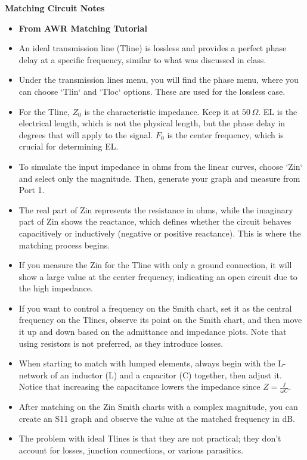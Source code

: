 \documentclass{article}
\begin{document}
\textbf{Matching Circuit Notes}
\begin{itemize}
    \item \textbf{From AWR Matching Tutorial}
    \item An ideal transmission line (Tline) is lossless and provides a perfect phase delay at a specific frequency, similar to what was discussed in class.
    \item Under the transmission lines menu, you will find the phase menu, where you can choose `Tlin` and `Tloc` options. These are used for the lossless case.
    \item For the Tline, \(Z_0\) is the characteristic impedance. Keep it at $50\,\Omega$. EL is the electrical length, which is not the physical length, but the phase delay in degrees that will apply to the signal. \(F_0\) is the center frequency, which is crucial for determining EL.
    \item To simulate the input impedance in ohms from the linear curves, choose `Zin` and select only the magnitude. Then, generate your graph and measure from Port 1.
    \item The real part of Zin represents the resistance in ohms, while the imaginary part of Zin shows the reactance, which defines whether the circuit behaves capacitively or inductively (negative or positive reactance). This is where the matching process begins.
    \item If you measure the Zin for the Tline with only a ground connection, it will show a large value at the center frequency, indicating an open circuit due to the high impedance.
    \item If you want to control a frequency on the Smith chart, set it as the central frequency on the Tlines, observe its point on the Smith chart, and then move it up and down based on the admittance and impedance plots. Note that using resistors is not preferred, as they introduce losses.
    \item When starting to match with lumped elements, always begin with the L-network of an inductor (L) and a capacitor (C) together, then adjust it. Notice that increasing the capacitance lowers the impedance since \( Z = \frac{j}{\omega C} \).
    \item After matching on the Zin Smith charts with a complex magnitude, you can create an S11 graph and observe the value at the matched frequency in dB.
    \item The problem with ideal Tlines is that they are not practical; they don't account for losses, junction connections, or various parasitics.

\end{itemize}
\end{document}
